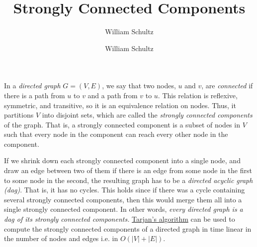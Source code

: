\documentclass[10pt,a4paper]{article}
\author{William Schultz}
\begin{document}
\title{Strongly Connected Components}
\author{William Schultz}
\maketitle

In a \textit{directed graph} $G=(V,E)$, we say that two nodes, $u$ and $v$, are \textit{connected} if there is a path from $u$ to $v$ and a path from $v$ to $u$. This relation is reflexive, symmetric, and transitive, so it is an equivalence relation on nodes. Thus, it partitions $V$ into disjoint sets, which are called the \textit{strongly connected components} of the graph. That is, a strongly connected component is a subset of nodes in $V$ such that every node in the component can reach every other node in the component.

If we shrink down each strongly connected component into a single node, and draw an edge between two of them if there is an edge from some node in the first to some node in the second, the resulting graph has to be a \textit{directed acyclic graph (dag)}. That is, it has no cycles. This holds since if there was a cycle containing several strongly connected components, then this would merge them all into a single strongly connected component. In other words, \textit{every directed graph is a dag of its strongly connected components.} \href{https://en.wikipedia.org/wiki/Tarjan%27s_strongly_connected_components_algorithm}{Tarjan's algorithm} can be used to compute the strongly connected components of a directed graph in time linear in the number of nodes and edges i.e. in $O(|V| + |E|)$.

% 
% 
\end{document}
